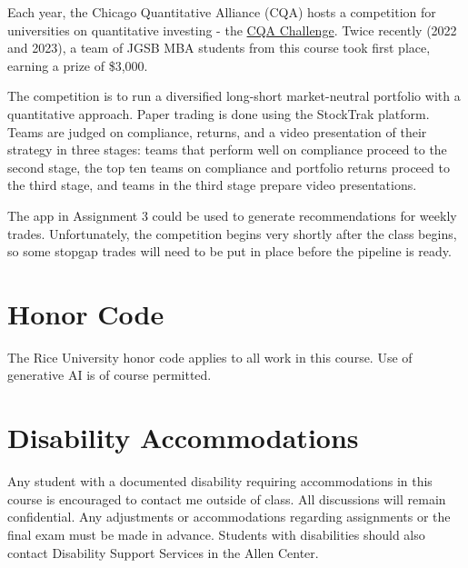 \documentclass[11pt]{article}
\begin{document}
Each year, the Chicago Quantitative Alliance (CQA) hosts a competition for universities on quantitative investing - the \href{https://www.cqa.org/investment_challenge}{CQA Challenge}. Twice recently (2022 and 2023), a team of JGSB MBA students from this course took first place, earning a prize of \$3,000.

The competition is to run a diversified long-short market-neutral portfolio with a quantitative approach. Paper trading is done using the StockTrak platform. Teams are judged on compliance, returns, and a video presentation of their strategy in three stages: teams that perform well on compliance proceed to the second stage, the top ten teams on compliance and portfolio returns proceed to the third stage, and teams in the third stage prepare video presentations.

The app in Assignment 3 could be used to generate recommendations for weekly trades. Unfortunately, the competition begins very shortly after the class begins, so some stopgap trades will need to be put in place before the pipeline is ready.

\section{Honor Code}

The Rice University honor code applies to all work in this course. Use of generative AI is of course permitted.

\section{Disability Accommodations}

Any student with a documented disability requiring accommodations in this course is encouraged to contact me outside of class. All discussions will remain confidential. Any adjustments or accommodations regarding assignments or the final exam must be made in advance. Students with disabilities should also contact Disability Support Services in the Allen Center.
\end{document}
